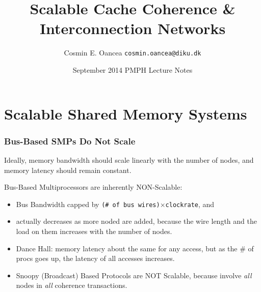 \documentclass{beamer}
\title[Interconnect]{Scalable Cache Coherence \&\\Interconnection Networks}
\author[C.~Oancea]{Cosmin E. Oancea {\tt cosmin.oancea@diku.dk}}
\institute{Department of Computer Science (DIKU)\\University of Copenhagen}
\date[Sept 2014]{September 2014 PMPH Lecture Notes}
\renewcommand{\emph}[1]{\textcolor{structure}{#1}}
\newcommand{\emp}[1]{\textcolor{DikuRed}{ #1}}
\begin{document}
\titleslide




\begin{frame}[fragile]
	\tableofcontents
\end{frame}


\section{Scalable Shared Memory Systems}

\begin{frame}[fragile,t]
\frametitle{Bus-Based SMPs Do Not Scale}

\emph{Ideally, memory bandwidth should scale linearly with the number of nodes,
and memory latency should remain constant}.\bigskip

\alert{Bus-Based Multiprocessors are inherently NON-Scalable}:\medskip
\begin{itemize}
    \item \emp{Bus Bandwidth} capped by {\tt (\# of bus wires)$\times$clockrate}, and
    \item \emp{actually decreases as more noded are added}, 
            because the wire length and the load on them 
            increases with the number of nodes.\bigskip
    \item Dance Hall: memory latency about the same for any access,
            but as the \# of procs goes up, the latency of all
            accesses increases.\bigskip
    \item \emp{Snoopy (Broadcast) Based Protocols are NOT Scalable},
            because involve {\em all} nodes in {\em all} coherence transactions. 
\end  {itemize}
\end{frame}
\end{document}
